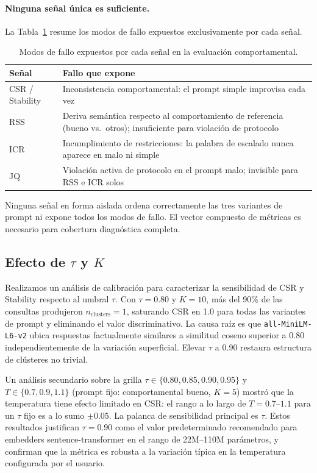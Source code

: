 \documentclass[11pt,a4paper]{article}
\begin{document}
\paragraph{Ninguna señal única es suficiente.}
La Tabla~\ref{tab:failures} resume los modos de fallo expuestos exclusivamente por cada señal.

\begin{table}[h]
\centering
\caption{Modos de fallo expuestos por cada señal en la evaluación comportamental.}
\label{tab:failures}
\begin{tabular}{lp{8.5cm}}
\toprule
Señal & Fallo que expone \\
\midrule
CSR / Stability & Inconsistencia comportamental: el prompt simple improvisa cada vez \\
RSS             & Deriva semántica respecto al comportamiento de referencia (bueno vs.\ otros); insuficiente para violación de protocolo \\
ICR             & Incumplimiento de restricciones: la palabra de escalado nunca aparece en malo ni simple \\
JQ              & Violación activa de protocolo en el prompt malo; invisible para RSS e ICR solos \\
\bottomrule
\end{tabular}
\end{table}

\noindent Ninguna señal en forma aislada ordena correctamente las tres variantes de prompt ni expone todos los modos de fallo. El vector compuesto de métricas es necesario para cobertura diagnóstica completa.

\subsection{Efecto de $\tau$ y $K$}
\label{sec:tau_k}

Realizamos un análisis de calibración para caracterizar la sensibilidad de CSR y Stability respecto al umbral $\tau$. Con $\tau = 0.80$ y $K = 10$, más del 90\% de las consultas produjeron $n_\mathrm{clusters} = 1$, saturando CSR en 1.0 para todas las variantes de prompt y eliminando el valor discriminativo. La causa raíz es que \texttt{all-MiniLM-L6-v2} ubica respuestas factualmente similares a similitud coseno superior a 0.80 independientemente de la variación superficial. Elevar $\tau$ a 0.90 restaura estructura de clústeres no trivial.

Un análisis secundario sobre la grilla $\tau \in \{0.80, 0.85, 0.90, 0.95\}$ y $T \in \{0.7, 0.9, 1.1\}$ (prompt fijo: comportamental bueno, $K = 5$) mostró que la temperatura tiene efecto limitado en CSR: el rango a lo largo de $T = 0.7$--$1.1$ para un $\tau$ fijo es a lo sumo $\pm 0.05$. La palanca de sensibilidad principal es $\tau$. Estos resultados justifican $\tau = 0.90$ como el valor predeterminado recomendado para embedders sentence-transformer en el rango de 22M--110M parámetros, y confirman que la métrica es robusta a la variación típica en la temperatura configurada por el usuario.
\end{document}
